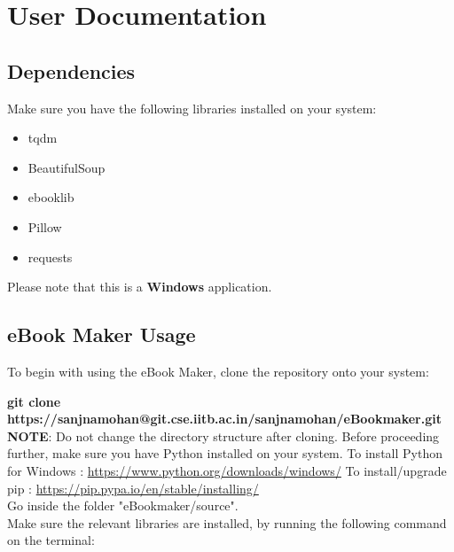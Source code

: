 \documentclass[12pt,a4paper,titlepage]{article}
\begin{document}
\section{\textbf{User Documentation}}
\subsection{\textbf{Dependencies}}
Make sure you have the following libraries installed on your system:
\begin{itemize}
    \item tqdm
    \item BeautifulSoup
    \item ebooklib
    \item Pillow
    \item requests
\end{itemize}
Please note that this is a \textbf{Windows} application.
\subsection{\textbf{eBook Maker Usage}}
To begin with using the eBook Maker, clone the repository onto your system:
\newline 

\textbf{git clone https://sanjnamohan@git.cse.iitb.ac.in/sanjnamohan/eBookmaker.git}
\newline 
\newline \textbf{NOTE}: Do not change the directory structure after cloning.
\newline Before proceeding further, make sure you have Python installed on your system.
\newline To install Python for Windows : \url{https://www.python.org/downloads/windows/}
To install/upgrade pip : \url{https://pip.pypa.io/en/stable/installing/}
\newline
\\Go inside the folder "eBookmaker/source". 
\newline
\\Make sure the relevant libraries are installed, by running the following command on the terminal:
\newline 
\end{document}
